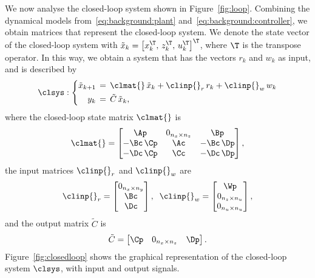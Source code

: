 We now analyse the closed-loop system shown in Figure~\ref{fig:loop}.
Combining the dynamical models from~\eqref{eq:background:plant} and~\eqref{eq:background:controller}, we obtain matrices that represent the closed-loop system.
We denote the state vector of the closed-loop system with $\tilde{x}_k = \left[ x_k^\T,\, z_k^\T,\, u_k^\T \right]^\T$, where $\T$ is the transpose operator.
In this way, we obtain a system that has the vectors $r_k$ and $w_k$ as input, and is described by
%
\begin{equation} 
\label{eq:feedback-basic}
    \clsys : \left\{
    \begin{aligned}
        \tilde{x}_{k+1} &\,=\, \clmat{}\,\tilde{x}_{k} + \clinp{}_r\,r_{k} + \clinp{}_w\,w_{k}\\
        y_{k} &\,=\, \tilde C\,\tilde{x}_{k},
    \end{aligned} \right.
\end{equation}
%
where the closed-loop state matrix $\clmat{}$ is
%
\begin{equation}
\label{eq:matrixA}
    \clmat{} =
    \begin{bmatrix} \Ap       & 0_{n_x \times n_z} & \Bp \\
                    -\Bc\,\Cp & \Ac                                      & -\Bc\,\Dp \\
                    -\Dc\,\Cp & \Cc                                      & -\Dc\,\Dp
    \end{bmatrix},
\end{equation}
%
the input matrices $\clinp{}_r$ and $\clinp{}_w$ are
%
\begin{equation}
    \clinp{}_r = \begin{bmatrix} 0_{n_x \times n_y} \\ \Bc \\ \Dc \end{bmatrix},\;\;
    \clinp{}_w = \begin{bmatrix} \Wp \\ 0_{n_z \times n_u} \\ 0_{n_u \times n_u} \end{bmatrix},
\end{equation}
%
and the output matrix $\tilde C$ is
%
\begin{equation}
    \tilde C = \begin{bmatrix} \Cp & 0_{n_x \times n_z} & \Dp \end{bmatrix}.
\end{equation}
%
Figure~\ref{fig:closedloop} shows the graphical representation of the closed-loop system $\clsys$, with input and output signals.

